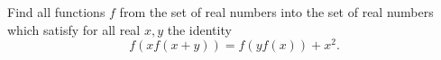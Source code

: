 Find all functions $f$ from the set of real numbers into the set of real numbers which satisfy for all real $x, y$ the identity
\[ f(xf(x+y)) = f(yf(x)) + x^{2}. \]
